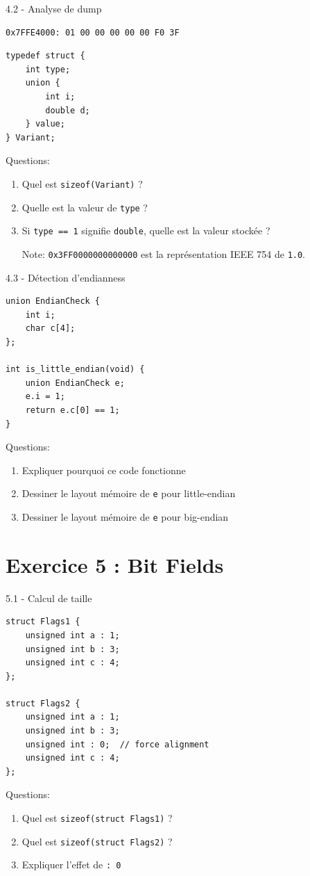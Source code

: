 \documentclass[10pt,a4paper]{article}
\begin{document}
\begin{exercicebox}{4.2 - Analyse de dump}
\begin{verbatim}
0x7FFE4000: 01 00 00 00 00 00 F0 3F
\end{verbatim}

\begin{lstlisting}
typedef struct {
    int type;
    union {
        int i;
        double d;
    } value;
} Variant;
\end{lstlisting}

Questions:
\begin{enumerate}
\item Quel est \texttt{sizeof(Variant)} ?
\item Quelle est la valeur de \texttt{type} ?
\item Si \texttt{type == 1} signifie \texttt{double}, quelle est la valeur stockée ?

Note: \texttt{0x3FF0000000000000} est la représentation IEEE 754 de \texttt{1.0}.
\end{enumerate}
\end{exercicebox}

\begin{exercicebox}{4.3 - Détection d'endianness}
\begin{lstlisting}
union EndianCheck {
    int i;
    char c[4];
};

int is_little_endian(void) {
    union EndianCheck e;
    e.i = 1;
    return e.c[0] == 1;
}
\end{lstlisting}

Questions:
\begin{enumerate}
\item Expliquer pourquoi ce code fonctionne
\item Dessiner le layout mémoire de \texttt{e} pour little-endian
\item Dessiner le layout mémoire de \texttt{e} pour big-endian
\end{enumerate}
\end{exercicebox}

\section{Exercice 5 : Bit Fields}

\begin{exercicebox}{5.1 - Calcul de taille}
\begin{lstlisting}
struct Flags1 {
    unsigned int a : 1;
    unsigned int b : 3;
    unsigned int c : 4;
};

struct Flags2 {
    unsigned int a : 1;
    unsigned int b : 3;
    unsigned int : 0;  // force alignment
    unsigned int c : 4;
};
\end{lstlisting}

Questions:
\begin{enumerate}
\item Quel est \texttt{sizeof(struct Flags1)} ?
\item Quel est \texttt{sizeof(struct Flags2)} ?
\item Expliquer l'effet de \texttt{: 0}
\end{enumerate}
\end{exercicebox}
\end{document}
